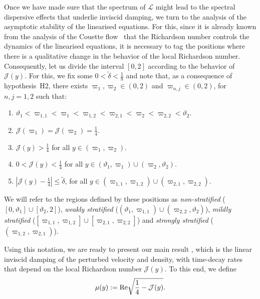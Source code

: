 \documentclass[11pt,reqno]{amsproc}
\theoremstyle{definition}
\numberwithin{equation}{section}
\renewcommand{\L}{{\mathcal{L}}}
\newcommand{\cJ}{{\mathcal{J}}}
\def\Re{{\rm Re}}
\begin{document}
Once we have made sure that the spectrum of $\L$ might lead to the spectral dispersive effects that underlie inviscid damping, we turn to the analysis of the asymptotic stability of the linearised equations. For this, since it is already known from the analysis of the Couette flow~\cites{BCZD22, YL18, CZN25chan, CZN23strip} that the Richardson number controls the dynamics of the linearised equations, it is necessary to tag the positions where there is a qualitative change in the behavior of the local Richardson number.
Consequently, let us divide the interval $[0,2]$ according to the behavior of~$\cJ(y)$. For this, we fix some $0< \tilde\delta < \frac18$ and note that, as a consequence of hypothesis~H2, there exists $\varpi_1, \varpi_2\in (0,2)$ and $\varpi_{n,j}\in (0,2)$, for $n,j=1,2$ such that:
\begin{enumerate}
\item $\vartheta_1 < \varpi_{1,1} <  \varpi_{1} < \varpi_{1,2} < \varpi_{2,1} < \varpi_{2}  < \varpi_{2,2} < \vartheta_2$.
\item $\cJ(\varpi_1) = \cJ(\varpi_2) =\frac14$.
\item $\cJ(y) >\frac14$ for all $y\in (\varpi_{1}, \varpi_2)$.
\item $0 <\cJ(y) < \frac14 $ for all $y\in (\vartheta_1, \varpi_1) \cup (\varpi_2, \vartheta_2)$.
\item $|\cJ(y)-\frac14| \leq \tilde\delta$,  for all $y\in (\varpi_{1,1}, \varpi_{1,2}) \cup (\varpi_{2,1}, \varpi_{2,2})$.
\end{enumerate}
We will refer to the regions defined by these positions as {\em non-stratified} ($[0,\vartheta_1] \cup [\vartheta_2,2]$), {\em weakly stratified} ($(\vartheta_1, \varpi_{1,1}) \cup (\varpi_{2,2}, \vartheta_2)$), {\em mildly stratified} ($[\varpi_{1,1}, \varpi_{1,2}] \cup [\varpi_{2,1}, \varpi_{2,2}]$) and {\em strongly stratified} ($(\varpi_{1,2}, \varpi_{2,1})$).


Using this notation, we are ready to present our main result , which is the linear inviscid damping of the perturbed velocity and density, with time-decay rates that depend on the local Richardson number $\cJ(y)$. To this end, we define 
\begin{align*}
 \mu(y) := \Re \sqrt{\frac14 - \cJ(y)} .
\end{align*}
\end{document}
